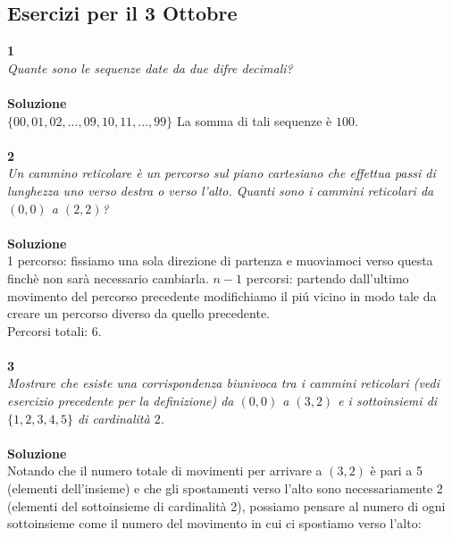 \documentclass[11pt]{article}
\begin{document}
            
            \subsection{Esercizi per il 3 Ottobre}
			\textbf{\large 1} \\
			\textit{Quante sono le sequenze date da due difre decimali?} \\\\
			\textbf{Soluzione} \\
			$\{00,01,02,...,09,10,11,...,99\}$ La somma di tali sequenze \`e $100$. \\\\
			\textbf{\large 2} \\
			\textit{Un cammino reticolare è un percorso sul piano cartesiano che 			effettua passi di lunghezza uno verso destra o verso l’alto. Quanti 				sono i cammini reticolari da $(0,0)$ a $(2,2)$?} \\\\
			\textbf{Soluzione} \\
			1 percorso: fissiamo una sola direzione di partenza e muoviamoci verso questa finch\`e non sar\`a necessario cambiarla.
			$n-1$ percorsi: partendo dall'ultimo movimento del percorso precedente modifichiamo il pi\'u vicino in modo tale da creare un percorso diverso da quello precedente. \\ 
			Percorsi totali: $6$. \\\\			
			\textbf{\large 3} \\
			\textit{Mostrare che esiste una corrispondenza biunivoca tra i cammini reticolari (vedi esercizio precedente per la definizione) da $(0,0)$ a $(3,2)$ e i sottoinsiemi di $\{1,2,3,4,5\}$ di cardinalit\`a $2$.}	\\\\
			\textbf{Soluzione} \\
			Notando che il numero totale di movimenti per arrivare a $(3,2)$ è pari a 5 (elementi dell'insieme) e che gli spostamenti verso l'alto sono necessariamente 2 (elementi del sottoinsieme di cardinalit\`a 2), possiamo pensare al numero di ogni sottoinsieme come il numero del movimento in cui ci spostiamo verso l'alto:\\
			
\end{document}
